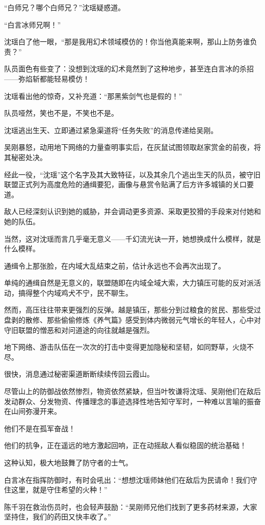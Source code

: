 “白师兄？哪个白师兄？”沈瑶疑惑道。

“白言冰师兄啊！”

沈瑶白了他一眼，“那是我用幻术领域模仿的！你当他真能来啊，那山上防务谁负责？”

队员面色有些变了：没想到沈瑶的幻术竟然到了这种地步，甚至连白言冰的杀招——弥焰斩都能轻易模仿！

沈瑶看出他的惊奇，又补充道：“那黑紫剑气也是假的！”

队员哑然，笑也不是，不笑也不是。

沈瑶逃出生天、立即通过紧急渠道将“任务失败”的消息传递给吴刚。

吴刚暴怒，动用地下网络的力量查明事实后，在灰鼠试图领取赵家赏金的前夜，将其秘密处决。

经此一役，“沈瑶”这个名字及其大致特征，以及其余几个逃出生天的队员，被守旧联盟正式列为高度危险的通缉要犯，画像与悬赏令贴满了后方许多城镇的关口要道。

敌人已经深刻认识到她的威胁，并会调动更多资源、采取更狡猾的手段来对付她和她的队伍。

当然，这对沈瑶而言几乎毫无意义——千幻流光诀一开，她想换成什么模样，就是什么模样。

通缉令上那张脸，在内域大乱结束之前，估计永远也不会再次出现了。

单纯的通缉自然是无意义的，联盟随即在内域全域大索，大力镇压可能的反对派活动，搞得整个内域鸡犬不宁，民不聊生。

然而，高压往往带来更强烈的反弹。越是镇压，那些分到过粮食的贫民、那些受过盘剥的散修、那些偷偷修炼《养气篇》感受到体内微弱元气增长的年轻人，心中对守旧联盟的憎恶和对问道途的向往就越是强烈。

地下网络、游击队伍在一次次的打击中变得更加隐秘和坚韧，如同野草，火烧不尽。

\vspace{2em}

很快，消息通过秘密渠道断断续续传回云霞山。

尽管山上的防御战依然惨烈，物资依然紧缺，但当叶牧谦将沈瑶、吴刚他们在敌后发动群众、分发物资、传播理念的事迹选择性地告知守军时，一种难以言喻的振奋在山间弥漫开来。

他们不是在孤军奋战！

他们的抗争，正在遥远的地方激起回响，正在动摇敌人看似稳固的统治基础！

这种认知，极大地鼓舞了防守者的士气。

白言冰在指挥防御时，有时会吼出：“想想沈瑶师妹他们在敌后为民请命！我们守住这里，就是守住希望的火种！”

陈千羽在救治伤员时，也会轻声鼓励：“吴刚师兄他们找到了更多药材来源，大家坚持住，我们的药田又快丰收了。”

